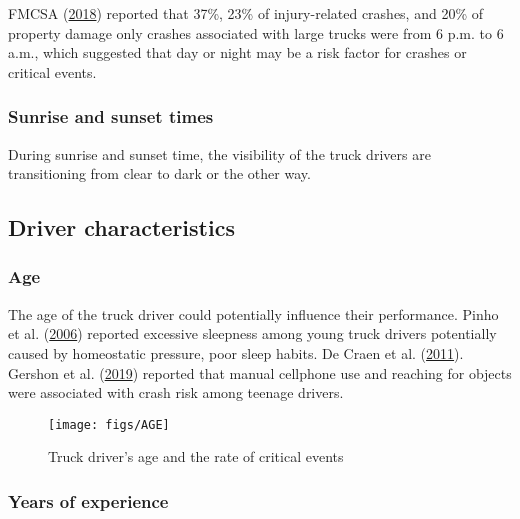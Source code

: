 \documentclass[]{elsarticle} %
\begin{document}
FMCSA (\protect\hyperlink{ref-fmcsareport2016}{2018}) reported that 37\%, 23\% of injury-related crashes, and 20\% of property damage only crashes associated with large trucks were from 6 p.m. to 6 a.m., which suggested that day or night may be a risk factor for crashes or critical events.

\hypertarget{sunrise-and-sunset-times}{%
\subsubsection{Sunrise and sunset times}\label{sunrise-and-sunset-times}}

During sunrise and sunset time, the visibility of the truck drivers are transitioning from clear to dark or the other way.

\hypertarget{driver-characteristics}{%
\subsection{Driver characteristics}\label{driver-characteristics}}

\hypertarget{age}{%
\subsubsection{Age}\label{age}}

The age of the truck driver could potentially influence their performance. Pinho et al. (\protect\hyperlink{ref-de2006hypersomnolence}{2006}) reported excessive sleepness among young truck drivers potentially caused by homeostatic pressure, poor sleep habits. De Craen et al. (\protect\hyperlink{ref-de2011young}{2011}). Gershon et al. (\protect\hyperlink{ref-gershon2019distracted}{2019}) reported that manual cellphone use and reaching for objects were associated with crash risk among teenage drivers.

\begin{figure}[!hb]

{\centering \texttt{[image: figs/AGE]} 

}

\caption{Truck driver's age and the rate of critical events}\label{fig:unnamed-chunk-4}
\end{figure}

\hypertarget{years-of-experience}{%
\subsubsection{Years of experience}\label{years-of-experience}}
\end{document}

